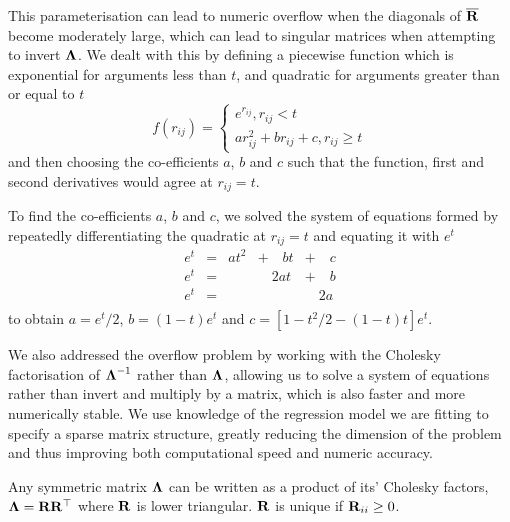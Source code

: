 \documentclass{amsart}[12pt]
\begin{document}
	This parameterisation can lead to numeric overflow when the diagonals of $\overline{{\bf R}}$ become moderately
	large, which can lead to singular matrices when attempting to invert ${\boldsymbol \Lambda}$. We dealt with this by
	defining a piecewise function which is exponential for arguments less than $t$, and quadratic for arguments
	greater than or equal to $t$
	$$
	f(r_{ij}) =
	\begin{cases}
	e^{r_{ij}}, r_{ij} < t \\
	a r_{ij}^2 + b r_{ij} + c, r_{ij} \geq t
	\end{cases}
	$$
	and then choosing the co-efficients $a$, $b$ and $c$ such that the function, first and second derivatives would
	agree at $r_{ij} = t$.

	To find the co-efficients $a$, $b$ and $c$, we solved the system of equations formed by repeatedly 
	differentiating the quadratic at $r_{ij} =  t$ and equating it with $e^t$
	$$
	\begin{array}{lllll}
	e^t &= &a t^2 &+ \quad b t &+ \quad c \\
	e^t &= &&\quad 2a t &+ \quad b \\
	e^t &= &&&\quad 2a \\
	\end{array}
	$$
	to obtain $a = e^t / 2$, $b = (1 - t) e^t$ and $c = [1 - t^2/2 - (1 - t) t] e^t$.

	We also addressed the overflow problem by working with the Cholesky factorisation of ${\boldsymbol \Lambda}^{-1}$
	rather than ${\boldsymbol \Lambda}$, allowing us to solve a system of equations rather than invert and multiply by a
	matrix, which is also faster and more numerically stable. We use knowledge of the regression  model we are
	fitting to specify a sparse matrix structure, greatly reducing the dimension of   the problem and thus
	improving both computational speed and numeric accuracy.

	
	Any symmetric matrix ${\boldsymbol \Lambda}$ can be written as a product of its' Cholesky factors, ${\boldsymbol \Lambda} =
	{\bf R} {\bf R}^\top$ where ${\bf R}$ is lower triangular. ${\bf R}$ is unique if ${\bf R}_{ii} \geq 0$.
	
\end{document}

